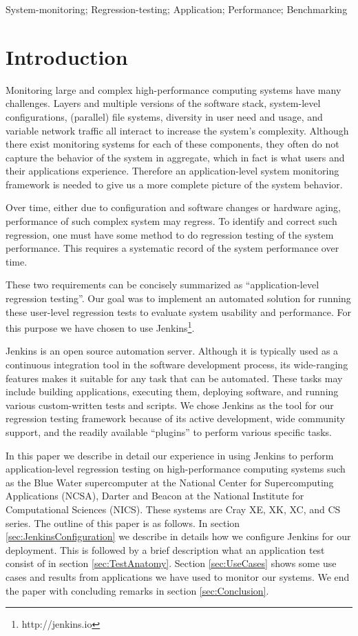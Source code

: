 \documentclass[10pt, conference, compsocconf]{IEEEtran}
\begin{document}
\begin{IEEEkeywords}
System-monitoring; Regression-testing; Application; Performance; Benchmarking
\end{IEEEkeywords}

\section{Introduction}
\label{sec:introduction}

Monitoring large and complex high-performance computing systems have many challenges. 
Layers and multiple versions of the software stack, system-level configurations, (parallel) file systems, diversity in user need and usage, and variable network traffic all interact to increase the system's complexity. 
Although there exist monitoring systems for each of these components, they often do not capture the behavior of the system in aggregate, which in fact is what users and their applications experience. 
Therefore an application-level system monitoring framework is needed to give us a more complete picture of the system behavior. 
 

Over time, either due to configuration and software changes or hardware aging, performance of such complex system may regress. 
To identify and correct such regression, one must have some method to do regression testing of the system performance. 
This requires a systematic record of the system performance over time.

These two requirements can be concisely summarized as ``application-level regression testing''. 
Our goal was to implement an automated solution for running these user-level regression tests to evaluate system usability and performance. 
For this purpose we have chosen to use Jenkins\footnote{http://jenkins.io}.

Jenkins is an open source automation server. 
Although it is typically used as a continuous integration tool in the software development process, its wide-ranging features makes it suitable for any task that can be automated. 
These tasks may include building applications, executing them, deploying software, and running various custom-written tests and scripts. 
We chose Jenkins as the tool for our regression testing framework because of its active development, wide community support, and the readily available ``plugins'' to perform various specific tasks.

In this paper we describe in detail our experience in using Jenkins to perform application-level regression testing on high-performance computing systems such as the Blue Water supercomputer at the National Center for Supercomputing Applications (NCSA), Darter and Beacon at the National Institute for Computational Sciences (NICS). 
These systems are Cray XE, XK, XC, and CS series. 
The outline of this paper is as follows. In section \ref{sec:JenkinsConfiguration} we describe in details how we configure Jenkins for our deployment. This is followed by a brief description what an application test consist of in section \ref{sec:TestAnatomy}. Section \ref{sec:UseCases} shows some use cases and results from applications we have used to monitor our systems. We end the paper with concluding remarks in section \ref{sec:Conclusion}.
\end{document}
